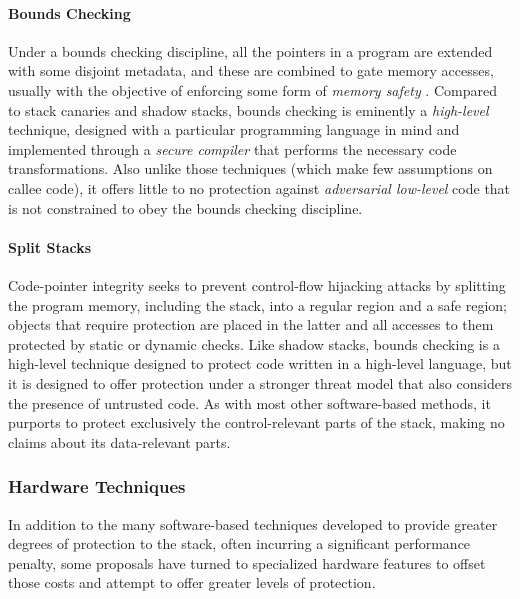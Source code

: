 \paragraph{Bounds Checking}
%
Under a bounds checking discipline, all the pointers in a program are extended
with some disjoint metadata, and these are combined to gate memory accesses,
usually with the objective of enforcing some form of \emph{memory
safety} .
%
Compared to stack canaries and shadow stacks, bounds checking is eminently
a \emph{high-level} technique, designed with a particular programming language
in mind and implemented through a \emph{secure compiler} \cite{} that performs
the necessary code transformations. Also unlike those techniques (which make few
assumptions on callee code), it offers little to no protection
against \emph{adversarial low-level} code that is not constrained to obey the
bounds checking discipline.
%


\paragraph{Split Stacks}
%
Code-pointer integrity seeks to prevent control-flow hijacking attacks by
splitting the program memory, including the stack, into a regular region and a
safe region; objects that require protection are placed in the latter and
all accesses to them protected by static or dynamic checks.
%
Like shadow stacks, bounds checking is a high-level technique designed to
protect code written in a high-level language, but it is designed to
offer protection under a stronger threat model that also considers the presence
of untrusted code. As with most other software-based methods, it purports to
protect exclusively the control-relevant parts of the stack, making no claims
about its data-relevant parts.

\subsubsection{Hardware Techniques}

In addition to the many software-based techniques developed to provide greater
degrees of protection to the stack, often incurring a significant performance penalty,
some proposals have turned to specialized hardware features to offset those
costs and attempt to offer greater levels of protection.

